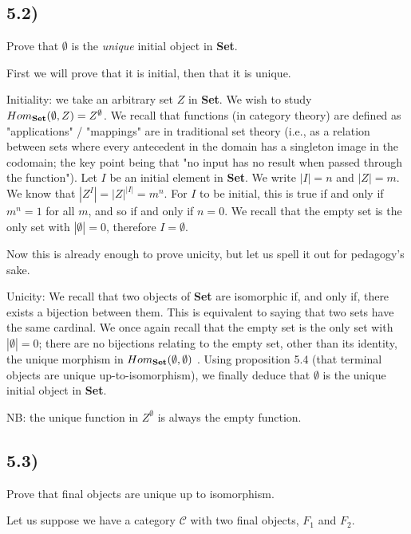 \documentclass[12pt, letterpaper, twoside]{report}
\begin{document}
\subsection*{5.2)}

Prove that $\emptyset$ is the \textit{unique} initial object in \textbf{Set}.

First we will prove that it is initial, then that it is unique.

Initiality: we take an arbitrary set $Z$ in \textbf{Set}. We wish to study $Hom_{\text{\textbf{Set}}}(\emptyset, Z) = Z^\emptyset$. We recall that functions (in category theory) are defined as "applications" / "mappings" are in traditional set theory (i.e., as a relation between sets where every antecedent in the domain has a singleton image in the codomain; the key point being that "no input has no result when passed through the function"). Let $I$ be an initial element in \textbf{Set}. We write $|I| = n$ and $|Z| = m$. We know that $|Z^I| = |Z|^{|I|} = m^n$. For $I$ to be initial, this is true if and only if $m^n = 1$ for all $m$, and so if and only if $n = 0$. We recall that the empty set is the only set with $|\emptyset| = 0$, therefore $I = \emptyset$.

Now this is already enough to prove unicity, but let us spell it out for pedagogy's sake.

Unicity: We recall that two objects of \textbf{Set} are isomorphic if, and only if, there exists a bijection between them. This is equivalent to saying that two sets have the same cardinal. We once again recall that the empty set is the only set with $|\emptyset| = 0$; there are no bijections relating to the empty set, other than its identity, the unique morphism in $Hom_{\text{\textbf{Set}}}(\emptyset, \emptyset)$ . Using proposition 5.4 (that terminal objects are unique up-to-isomorphism), we finally deduce that $\emptyset$ is the unique initial object in \textbf{Set}.

NB: the unique function in $Z^\emptyset$ is always the empty function.



\subsection*{5.3)}

Prove that final objects are unique up to isomorphism.

Let us suppose we have a category $\mathcal{C}$ with two final objects, $F_1$ and $F_2$.
\end{document}

